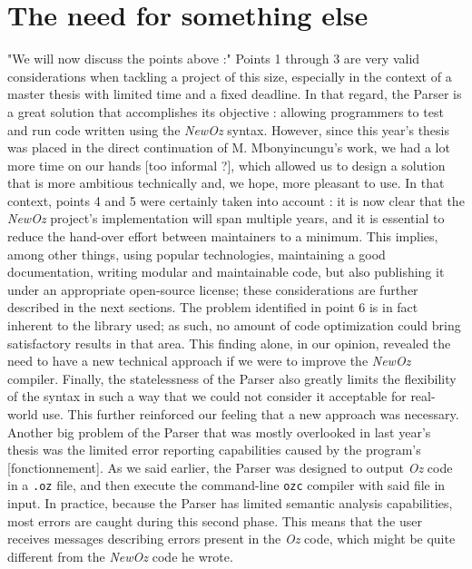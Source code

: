 \section{The need for something else}\label{sec:ch3-problems}
"We will now discuss the points above :"
Points 1 through 3 are very valid considerations when tackling a project of this size, especially in the context of a master thesis with limited time and a fixed deadline.
In that regard, the Parser is a great solution that accomplishes its objective : allowing programmers to test and run code written using the \textit{NewOz} syntax.\newline
However, since this year's thesis was placed in the direct continuation of M. Mbonyincungu's work, we had a lot more time on our hands [too informal ?], which allowed us to design a solution that is more ambitious technically and, we hope, more pleasant to use.
In that context, points 4 and 5 were certainly taken into account : it is now clear that the \textit{NewOz} project's implementation will span multiple years, and it is essential to reduce the hand-over effort between maintainers to a minimum.
This implies, among other things, using popular technologies, maintaining a good documentation, writing modular and maintainable code, but also publishing it under an appropriate open-source license;
these considerations are further described in the next sections.\newline
The problem identified in point 6 is in fact inherent to the library used;
as such, no amount of code optimization could bring satisfactory results in that area.
This finding alone, in our opinion, revealed the need to have a new technical approach if we were to improve the \textit{NewOz} compiler.\newline
Finally, the statelessness of the Parser also greatly limits the flexibility of the syntax in such a way that we could not consider it acceptable for real-world use.
This further reinforced our feeling that a new approach was necessary.\newline
Another big problem of the Parser that was mostly overlooked in last year's thesis was the limited error reporting capabilities caused by the program's [fonctionnement].
As we said earlier, the Parser was designed to output \textit{Oz} code in a \texttt{.oz} file, and then execute the command-line \texttt{ozc} compiler with said file in input.
In practice, because the Parser has limited semantic analysis capabilities, most errors are caught during this second phase.
This means that the user receives messages describing errors present in the \textit{Oz} code, which might be quite different from the \textit{NewOz} code he wrote.
